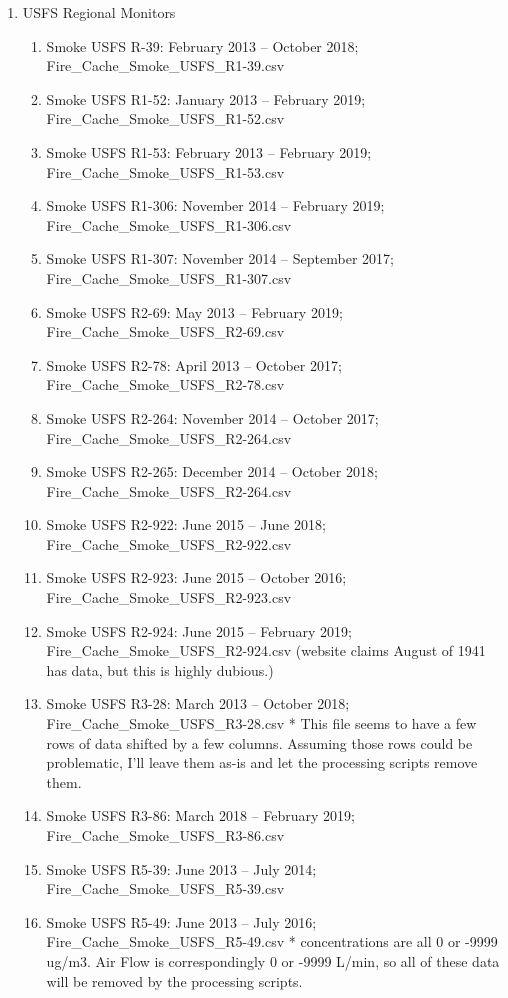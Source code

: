 \begin{enumerate}
\item USFS Regional Monitors
\begin{enumerate}[nolistsep]
\item Smoke USFS R-39: February 2013 -- October 2018; Fire\_Cache\_Smoke\_USFS\_R1-39.csv
\item Smoke USFS R1-52: January 2013 -- February 2019; Fire\_Cache\_Smoke\_USFS\_R1-52.csv
\item Smoke USFS R1-53: February 2013 -- February 2019; Fire\_Cache\_Smoke\_USFS\_R1-53.csv
\item Smoke USFS R1-306: November 2014 -- February 2019; Fire\_Cache\_Smoke\_USFS\_R1-306.csv
\item Smoke USFS R1-307: November 2014 -- September 2017; Fire\_Cache\_Smoke\_USFS\_R1-307.csv
\item Smoke USFS R2-69: May 2013 -- February 2019; Fire\_Cache\_Smoke\_USFS\_R2-69.csv
\item Smoke USFS R2-78: April 2013 -- October 2017; Fire\_Cache\_Smoke\_USFS\_R2-78.csv
\item Smoke USFS R2-264: November 2014 -- October 2017; Fire\_Cache\_Smoke\_USFS\_R2-264.csv
\item Smoke USFS R2-265: December 2014 -- October 2018; Fire\_Cache\_Smoke\_USFS\_R2-264.csv
\item Smoke USFS R2-922: June 2015 -- June 2018; Fire\_Cache\_Smoke\_USFS\_R2-922.csv
\item Smoke USFS R2-923: June 2015 -- October 2016; Fire\_Cache\_Smoke\_USFS\_R2-923.csv
\item Smoke USFS R2-924: June 2015 -- February 2019; Fire\_Cache\_Smoke\_USFS\_R2-924.csv  (website claims August of 1941 has data, but this is highly dubious.)
\item Smoke USFS R3-28: March 2013 -- October 2018; Fire\_Cache\_Smoke\_USFS\_R3-28.csv  * This file seems to have a few rows of data shifted by a few columns. Assuming those rows could be problematic, I'll leave them as-is and let the processing scripts remove them.
\item Smoke USFS R3-86: March 2018 -- February 2019; Fire\_Cache\_Smoke\_USFS\_R3-86.csv
\item Smoke USFS R5-39: June 2013 -- July 2014; Fire\_Cache\_Smoke\_USFS\_R5-39.csv
\item Smoke USFS R5-49: June 2013 -- July 2016; Fire\_Cache\_Smoke\_USFS\_R5-49.csv * concentrations are all 0 or -9999 ug/m3. Air Flow is correspondingly 0 or -9999 L/min, so all of these data will be removed by the processing scripts. 

\end{enumerate}
\end{enumerate}
